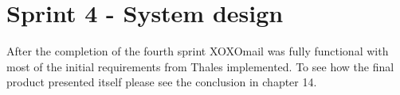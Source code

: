 \section{Sprint 4 - System design}


After the completion of the fourth sprint XOXOmail was fully functional with most of the initial requirements from Thales implemented. To see how the final product presented itself please see the conclusion in chapter 14.